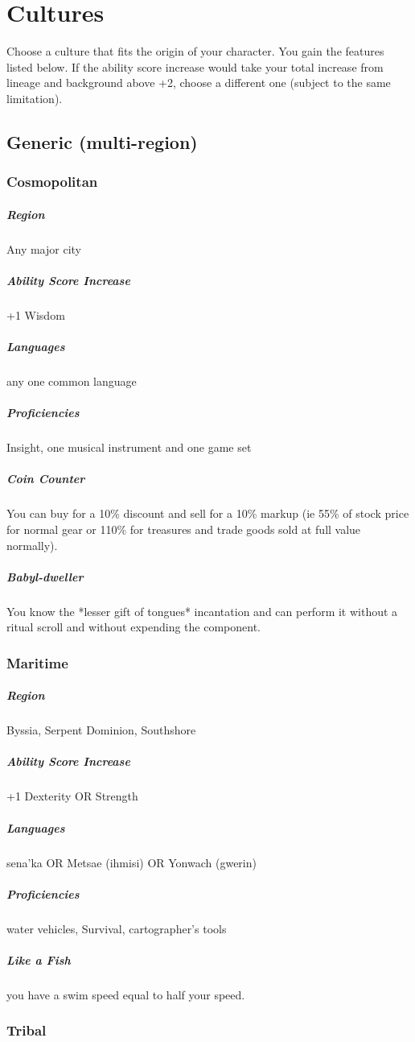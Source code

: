 \section{Cultures}\label{sec:cultures}
Choose a culture that fits the origin of your character.  You gain the features listed below. If the ability score increase would take your total increase from lineage and background above +2, choose a different one (subject to the same limitation).

\subsection{Generic (multi-region)}
\subsubsection{Cosmopolitan}

\subparagraph*{Region} Any major city

\subparagraph*{Ability Score Increase} +1 Wisdom

\subparagraph*{Languages} any one common language

\subparagraph*{Proficiencies} Insight, one musical instrument and one game set

\subparagraph*{Coin Counter} You can buy for a 10\% discount and sell for a 10\% markup (ie 55\% of stock price for normal gear or 110\% for treasures and trade goods sold at full value normally).

\subparagraph*{Babyl-dweller} You know the *lesser gift of tongues* incantation and can perform it without a ritual scroll and without expending the component.

\subsubsection{Maritime}

\subparagraph*{Region} Byssia, Serpent Dominion, Southshore

\subparagraph*{Ability Score Increase} +1 Dexterity OR Strength

\subparagraph*{Languages} sena'ka OR Metsae (ihmisi) OR Yonwach (gwerin)

\subparagraph*{Proficiencies} water vehicles, Survival, cartographer's tools

\subparagraph*{Like a Fish} you have a swim speed equal to half your speed.

\subsubsection{Tribal}

